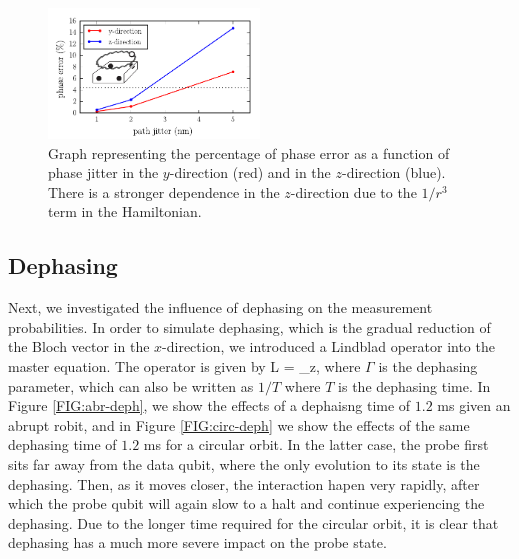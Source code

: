 \begin{figure}[h]
  \centering
    \includegraphics[width=0.5\textwidth]{../Figures/path_jit.pdf}
      \caption{Graph representing the percentage of phase error as a function of phase jitter in the $y$-direction (red) and in the $z$-direction (blue). There is a stronger dependence in the $z$-direction due to the $1/r^3$ term in the Hamiltonian.}
      \label{fig:pathjitter}
\end{figure}







\subsection{Dephasing}
Next, we investigated the influence of dephasing on the measurement probabilities. In order to simulate dephasing, which is the gradual reduction of the Bloch vector in the $x$-direction, we introduced a Lindblad operator into the master equation. The operator is given by 
\beq
L  = \sqrt{\Gamma} \sigma_z,
\eeq
where $\Gamma$ is the dephasing parameter, which can also be written as $1/T$ where $T$ is the dephasing time. In Figure \ref{FIG:abr-deph}, we show the effects of a dephaisng time of $1.2$ ms given an abrupt robit, and in Figure \ref{FIG:circ-deph} we show the effects of the same dephasing time of $1.2$ ms for a circular orbit. In the latter case, the probe first sits far away from the data qubit, where the only evolution to its state is the dephasing. Then, as it moves closer, the interaction hapen very rapidly, after which the probe qubit will again slow to a halt and continue experiencing the dephasing. Due to the longer time required for the circular orbit, it is clear that dephasing has a much more severe impact on the probe state. 

